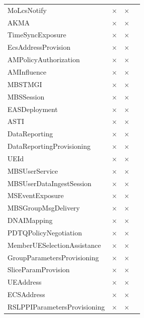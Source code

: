 \begin{longtable}{p{6cm} c c c}
\rowcolor{white}
MoLcsNotify                  & $\times$             & $\times$ \\
\rowcolor{gray!15}
AKMA                         & $\times$             & $\times$ \\
\rowcolor{white}
TimeSyncExposure             & $\times$             & $\times$ \\
\rowcolor{gray!15}
EcsAddressProvision          & $\times$             & $\times$ \\
\rowcolor{white}
AMPolicyAuthorization        & $\times$             & $\times$ \\
\rowcolor{gray!15}
AMInfluence                  & $\times$             & $\times$ \\
\rowcolor{white}
MBSTMGI                      & $\times$             & $\times$ \\
\rowcolor{gray!15}
MBSSession                   & $\times$             & $\times$ \\
\rowcolor{white}
EASDeployment                & $\times$             & $\times$ \\
\rowcolor{gray!15}
ASTI                         & $\times$             & $\times$ \\
\rowcolor{white}
DataReporting                & $\times$             & $\times$ \\
\rowcolor{gray!15}
DataReportingProvisioning    & $\times$             & $\times$ \\
\rowcolor{white}
UEId                         & $\times$             & $\times$ \\
\rowcolor{gray!15}
MBSUserService               & $\times$             & $\times$ \\
\rowcolor{white}
MBSUserDataIngestSession     & $\times$             & $\times$ \\
\rowcolor{gray!15}
MSEventExposure              & $\times$             & $\times$ \\
\rowcolor{white}
MBSGroupMsgDelivery          & $\times$             & $\times$ \\
\rowcolor{gray!15}
DNAIMapping                  & $\times$             & $\times$ \\
\rowcolor{white}
PDTQPolicyNegotiation        & $\times$             & $\times$ \\
\rowcolor{gray!15}
MemberUESelectionAssistance  & $\times$             & $\times$ \\
\rowcolor{white}
GroupParametersProvisioning  & $\times$             & $\times$ \\
\rowcolor{gray!15}
SliceParamProvision          & $\times$             & $\times$ \\
\rowcolor{white}
UEAddress                    & $\times$             & $\times$ \\
\rowcolor{gray!15}
ECSAddress                   & $\times$             & $\times$ \\
\rowcolor{white}
RSLPPIParametersProvisioning & $\times$             & $\times$ \\
\end{longtable}

